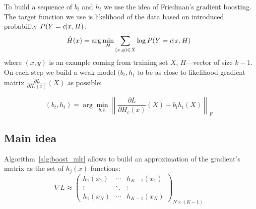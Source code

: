 \documentclass{article}
\begin{document}
To build a sequence of $b_t$ and $h_t$ we use the idea of Friedman's gradient boosting. The target function we use is likelihood of the data based on introduced probability $P(Y = c \arrowvert x, H)$:
$$
\hat{H}(x) = \arg \min_H \sum_{(x,y) \in X} \log P(Y = c \arrowvert x, H)
$$
where $(x,y)$ is an example coming from training set $X$, $H$---vector of size $k-1$. On each step we build a weak model $(b_t, h_)$ to be as close to likelihood gradient matrix $\frac{\partial L}{\partial H_c(x)}\left(X\right)$ as possible:

$$
(b_t, h_t) = \arg \min_{b,h} \left\|\frac{\partial L}{\partial H_c(x)}\left(X\right) - b_t h_t(X)\right\|_F
$$








\subsection{Main idea}
Algorithm~\ref{alg:boost_mlr} allows to build an approximation of the gradient's matrix as the set of $h_j(x)$ functions:
\[
	\nabla L \approx
	\begin{pmatrix}
		h_{1}(x_{1}) & \cdots & h_{K-1}(x_{1}) \\
			  \vdots & \ddots & \vdots \\
		h_{1}(x_{N}) & \cdots & h_{K-1}(x_{N})
	\end{pmatrix}_{N\times(K-1)}
\]
\end{document}

